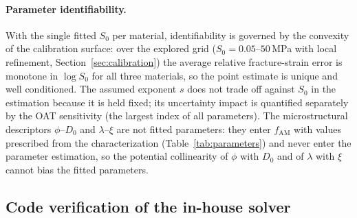 \documentclass[12pt,a4paper,twocolumn]{article}
\begin{document}
\paragraph{Parameter identifiability.} With the single fitted $S_0$ per material, identifiability is governed by the convexity of the calibration surface: over the explored grid ($S_0 = 0.05$--$50$\,MPa with local refinement, Section~\ref{sec:calibration}) the average relative fracture-strain error is monotone in $\log S_0$ for all three materials, so the point estimate is unique and well conditioned. The assumed exponent $s$ does not trade off against $S_0$ in the estimation because it is held fixed; its uncertainty impact is quantified separately by the OAT sensitivity (the largest index of all parameters). The microstructural descriptors $\phi$--$D_0$ and $\lambda$--$\xi$ are not fitted parameters: they enter $f_{\mathrm{AM}}$ with values prescribed from the characterization (Table~\ref{tab:parameters}) and never enter the parameter estimation, so the potential collinearity of $\phi$ with $D_0$ and of $\lambda$ with $\xi$ cannot bias the fitted parameters.

\subsection{Code verification of the in-house solver}
\label{sec:code_verification}
\end{document}
